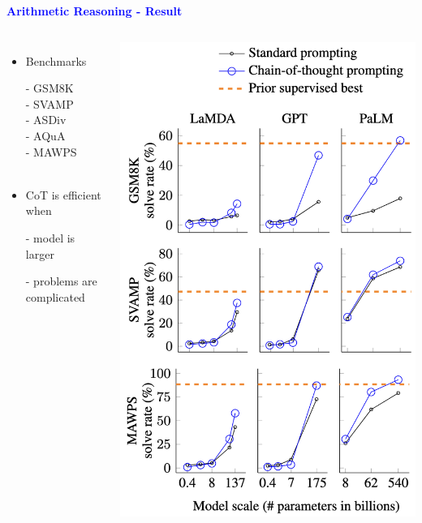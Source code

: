 \documentclass[professionalfont]{beamer}
\begin{document}
\begin{frame}
\begin{center}
    { \textbf{\textcolor{blue}{ {\fontsize{12}{14}\selectfont Arithmetic Reasoning - Result} }} }
\end{center}

\begin{columns}
    {\fontsize{10}{14}\selectfont 
    \begin{itemize}
        \item Benchmarks

        - GSM8K \\
        - SVAMP \\
        - ASDiv \\
        - AQuA \\
        - MAWPS \\

        \\[0.3cm]

        \item CoT is efficient when

        - model is larger

        - problems are complicated
    \end{itemize}
    }
    \includegraphics[width=0.9\linewidth]{figure4.png}
\end{columns}

\end{frame}
\end{document}
